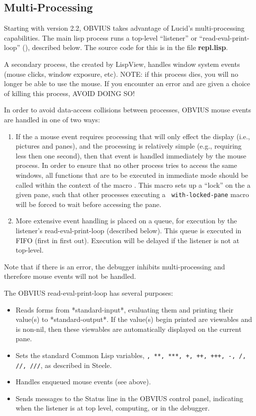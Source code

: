 \subsection{Multi-Processing}
\label{sec:multi-processing}

Starting with version 2.2, OBVIUS takes advantage of Lucid's
multi-processing capabilities.  The main lisp process runs a top-level
``listener'' or ``read-eval-print-loop'' (), described
below.  The source code for this is in the file {\bf repl.lisp}.

A secondary process, the  created by
LispView, handles window system events (mouse clicks, window exposure,
etc).  NOTE: if this process dies, you will no longer be able to use
the mouse.  If you encounter an error and are given a choice of
killing this process, AVOID DOING SO!

In order to avoid data-access collisions between processes, OBVIUS
mouse events are handled in one of two ways:
\begin{enumerate}
\item  If the a mouse event
requires processing that will only effect the display (i.e., pictures
and panes), and the processing is relatively simple (e.g., requiring
less then one second), then that event is handled immediately by the
mouse process.  In order to ensure that no other process tries to
access the same windows, all functions that are to be executed in
immediate mode should be called within the context of the macro
.  This macro sets up a ``lock'' on the a given
pane, such that other processes executing a {\tt
with-locked-pane} macro will be forced to wait before accessing the pane.
\item More extensive event handling is placed on a queue, for
execution by the listener's read-eval-print-loop (described below).
This queue is executed in FIFO (first in first out).  Execution will
be delayed if the listener is not at top-level.
\end{enumerate}
Note that if there is an error, the debugger inhibits multi-processing
and therefore mouse events will not be handled.

The OBVIUS read-eval-print-loop has several purposes:
\begin{itemize}
\item Reads forms from *standard-input*, evaluating them and printing
their value(s) to *standard-output*.  If the value(s) begin printed
are viewables and  is non-nil, then
these viewables are automatically displayed on the current pane.
\item Sets the standard Common Lisp variables, {\tt *, **, ***, +, ++,
+++, -, /, //, ///}, as described in Steele.
\item Handles enqueued mouse events (see above).
\item Sends messages to the Status line in the OBVIUS control panel,
indicating when the listener is at top level, computing, or in the
debugger. 
\end{itemize}

